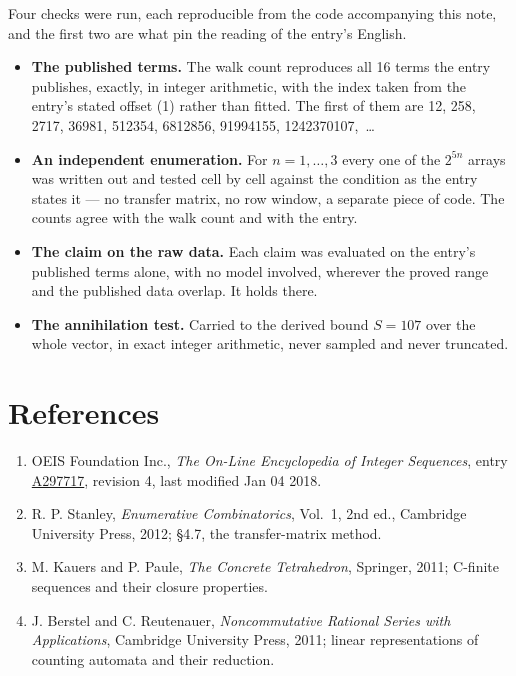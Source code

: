 \documentclass[11pt]{article}
\theoremstyle{definition}
\begin{document}
Four checks were run, each reproducible from the code accompanying this note, and the first two are what pin the reading of the entry's English.

\begin{itemize}

\item {\bfseries The published terms.} The walk count reproduces all 16 terms the entry publishes, exactly, in integer arithmetic, with the index taken from the entry's stated offset (1) rather than fitted. The first of them are 12, 258, 2717, 36981, 512354, 6812856, 91994155, 1242370107,~\dots

\item {\bfseries An independent enumeration.} For $n = 1,\dots,3$ every one of the $2^{5n}$ arrays was written out and tested cell by cell against the condition as the entry states it --- no transfer matrix, no row window, a separate piece of code. The counts agree with the walk count and with the entry.

\item {\bfseries The claim on the raw data.} Each claim was evaluated on the entry's published terms alone, with no model involved, wherever the proved range and the published data overlap. It holds there.

\item {\bfseries The annihilation test.} Carried to the derived bound $S = 107$ over the whole vector, in exact integer arithmetic, never sampled and never truncated.

\end{itemize}

\section{References}

\begin{enumerate}

\item OEIS Foundation Inc., \emph{The On-Line Encyclopedia of Integer Sequences}, entry \href{https://oeis.org/A297717}{A297717}, revision 4, last modified Jan 04 2018.

\item R. P. Stanley, \emph{Enumerative Combinatorics}, Vol.~1, 2nd ed., Cambridge University Press, 2012; \S4.7, the transfer-matrix method.

\item M. Kauers and P. Paule, \emph{The Concrete Tetrahedron}, Springer, 2011; C-finite sequences and their closure properties.

\item J. Berstel and C. Reutenauer, \emph{Noncommutative Rational Series with Applications}, Cambridge University Press, 2011; linear representations of counting automata and their reduction.

\end{enumerate}
\end{document}
